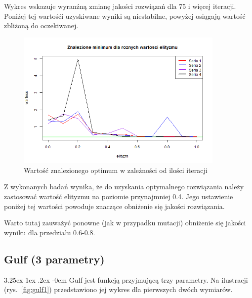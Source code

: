 \documentclass[11pt, a4paper]{article}
\makeatletter
\newcommand{\fbi}{\leavevmode{\parindent=1em\indent}}
\renewcommand\paragraph{\@startsection{paragraph}{5}{\z@}%
  {3.25ex \@plus1ex \@minus.2ex}%
  {-0em}%
  {\normalfont\normalsize\bfseries}}
\makeatother
\begin{document}
\fbi
Wykres wskazuje wyranźną zmianę jakości rozwiązań dla 75 i więcej iteracji. Poniżej tej wartośći uzyskiwane wyniki są niestabilne, powyżej osiągają wartość zbliżoną do oczekiwanej.

\begin{figure}[H]
	\centering
	\includegraphics[width=0.9\textwidth]{./assets/Branin6.png} %
	\caption{Wartość znalezionego optimum w zależności od ilości iteracji}
	\label{fig:branin6}
\end{figure}

\fbi
Z wykonanych badań wynika, że do uzyskania optymalnego rozwiązania należy zastosować wartość elityzmu na poziomie przynajmniej 0.4. Jego ustawienie poniżej tej wartości powoduje znaczące obniżenie się jakości rozwiązania.

\fbi
Warto tutaj zauważyć ponowne (jak w przypadku mutacji) obniżenie się jakości wyniku dla przedziału 0.6-0.8.

\subsection{Gulf (3 parametry)}
\paragraph{}
Gulf jest funkcją przyjmującą trzy parametry. Na ilustracji (rys.~\ref{fig:gulf1}) przedstawiono jej wykres dla pierwszych dwóch wymiarów.
\end{document}
